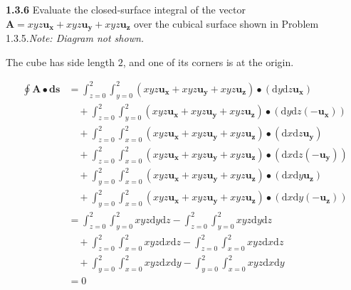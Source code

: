\documentclass{article}
\begin{document}
\textbf{1.3.6} Evaluate the closed-surface integral of the vector $\mathbf{A} = xyz\mathbf{u_x} + xyz\mathbf{u_y} +
	xyz\mathbf{u_z}$ over the cubical surface shown in Problem 1.3.5.\@ \textit{Note: Diagram not shown.}

\vspace{24pt}

The cube has side length $2$, and one of its corners is at the origin.

\begin{equation*}
	\begin{split}
		\oint \mathbf{A} \bullet \mathbf{ds} & = \int_{z=0}^2 \int_{y=0}^2 (xyz\mathbf{u_x} + xyz\mathbf{u_y} + xyz\mathbf{u_z}) \bullet (\text{d}y\text{d}z\mathbf{u_x}) \\
		& \quad + \int_{z=0}^2 \int_{y=0}^2 (xyz\mathbf{u_x} + xyz\mathbf{u_y} + xyz\mathbf{u_z}) \bullet (\text{d}y\text{d}z(-\mathbf{u_x})) \\
		& \quad + \int_{z=0}^2 \int_{x=0}^2 (xyz\mathbf{u_x} + xyz\mathbf{u_y} + xyz\mathbf{u_z}) \bullet (\text{d}x\text{d}z\mathbf{u_y}) \\
		& \quad + \int_{z=0}^2 \int_{x=0}^2 (xyz\mathbf{u_x} + xyz\mathbf{u_y} + xyz\mathbf{u_z}) \bullet (\text{d}x\text{d}z(-\mathbf{u_y})) \\
		& \quad + \int_{y=0}^2 \int_{x=0}^2 (xyz\mathbf{u_x} + xyz\mathbf{u_y} + xyz\mathbf{u_z}) \bullet (\text{d}x\text{d}y\mathbf{u_z}) \\
		& \quad + \int_{y=0}^2 \int_{x=0}^2 (xyz\mathbf{u_x} + xyz\mathbf{u_y} + xyz\mathbf{u_z}) \bullet (\text{d}x\text{d}y(-\mathbf{u_z})) \\
		& = \int_{z=0}^2 \int_{y=0}^2 xyz \text{d}y\text{d}z - \int_{z=0}^2 \int_{y=0}^2 xyz \text{d}y\text{d}z \\
		& \quad + \int_{z=0}^2 \int_{x=0}^2 xyz \text{d}x\text{d}z - \int_{z=0}^2 \int_{x=0}^2 xyz \text{d}x\text{d}z \\
		& \quad + \int_{y=0}^2 \int_{x=0}^2 xyz \text{d}x\text{d}y - \int_{y=0}^2 \int_{x=0}^2 xyz \text{d}x\text{d}y \\
		& = 0
	\end{split}
\end{equation*}
\end{document}
